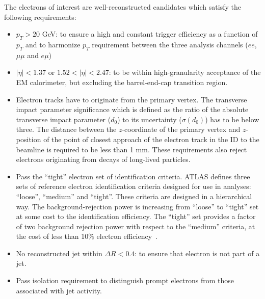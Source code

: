 The electrons of interest are well-reconstructed candidates which satisfy
the following requirements:
\begin{itemize}
 \item $p_T > 20$ GeV: to ensure a high and constant trigger efficiency as a function of $p_T$ and to harmonize $p_T$ requirement between the three analysis channels ($ee$, $\mu\mu$ and $e\mu$) 
 \item $|\eta|<1.37$ or $1.52<|\eta|<2.47$: to be within high-granularity acceptance of the EM calorimeter, but excluding the barrel-end-cap transition region.
 \item Electron tracks have to originate from the primary vertex.
 The transverse impact parameter significance which is defined as the ratio of the absolute transverse impact parameter ($d_0$) to its uncertainty ($\sigma(d_0)$) has to be below three. The distance between the $z$-coordinate of the primary vertex and $z$-position of the point of closest approach of the electron track in the ID to the beamline is required to be less than 1 mm.
 These requirements also reject electrons originating from decays of long-lived particles.
 \item Pass the ``tight'' electron set of identification criteria. 
 ATLAS defines three sets of reference electron identification criteria designed for use in analyses: ``loose'', ``medium'' and ``tight''.
 These criteria are designed in a hierarchical way. The background-rejection power is increasing from ``loose'' to ``tight'' set at some cost to the identification efficiency.
 The ``tight'' set provides a factor of two background rejection power with respect to the ``medium'' criteria, at the cost of less than 10$\%$ electron efficiency~\cite{electron_tight}.
 \item No reconstructed jet within $\Delta R < 0.4$: 
 to ensure that electron is not part of a jet.
 \item Pass isolation requirement to distinguish prompt electrons from those associated with jet activity.
\end{itemize}

